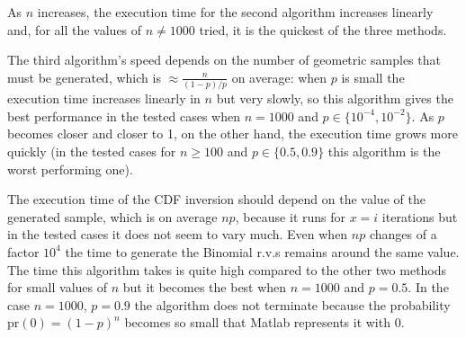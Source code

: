 \documentclass[a4paper,oneside]{article}
\begin{document}
As $n$ increases, the execution time for the second algorithm
increases linearly and, for all the values of $n \neq 1000$ tried, it
is the quickest of the three methods.

The third algorithm's speed depends on the number of geometric samples
that must be generated, which is $\approx \frac{n}{(1-p)/p}$ on
average: when $p$ is small the execution time increases linearly in
$n$ but very slowly, so this algorithm gives the best performance in
the tested cases when $n = 1000$ and $p \in \{10^{-4}, 10^{-2}\}$. As
$p$ becomes closer and closer to 1, on the other hand, the execution
time grows more quickly (in the tested cases for $n \geq 100$ and $p
\in \{0.5, 0.9\}$ this algorithm is the worst performing one).

The execution time of the CDF inversion should depend on the value of
the generated sample, which is on average $np$, because it runs for
$x=i$ iterations but in the tested cases it does not seem to vary
much.  Even when $np$ changes of a factor $10^4$ the time to generate
the Binomial r.v.s remains around the same value. The time this
algorithm takes is quite high compared to the other two methods for
small values of $n$ but it becomes the best when $n = 1000$ and $p =
0.5$. In the case $n = 1000$, $p=0.9$ the algorithm does not terminate
because the probability $\mathrm{pr}(0) = (1-p)^n$ becomes so small
that Matlab represents it with 0.
\end{document}
